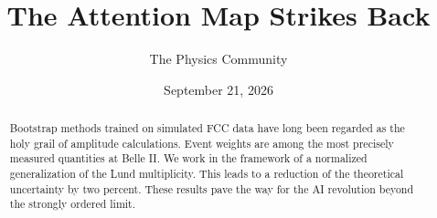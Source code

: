 \documentclass[11pt]{article}
\title{The Attention Map Strikes Back}
\author{The Physics Community}
\date{September 21, 2026}
\begin{document}
\maketitle
\begin{abstract}
Bootstrap methods trained on simulated FCC data have long been regarded
as the holy grail of amplitude calculations. Event weights are among the
most precisely measured quantities at Belle II. We work in the framework
of a normalized generalization of the Lund multiplicity. This leads to a
reduction of the theoretical uncertainty by two percent. These results
pave the way for the AI revolution beyond the strongly ordered limit.
\end{abstract}
\tableofcontents



\nocite{*}


\end{document}
